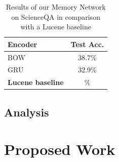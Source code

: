 \begin{table}
    \centering
    \begin{tabular}{|l|c|}
    \hline
    \textbf{Encoder} & \textbf{Test Acc.}\\
    \hline
    BOW & 38.7\% \\
    GRU & 32.9\% \\
    \hline
    \hline
    \textbf{Lucene baseline} & \% \\
    \hline
    \end{tabular}
    \caption{Results of our Memory Network on ScienceQA in comparison with a Lucene baseline}
    \label{tab:memnet_qa_results}
\end{table}


\subsection{Analysis}

\section{Proposed Work}